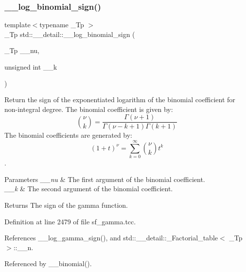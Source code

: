 \subsubsection{\texorpdfstring{\+\_\+\+\_\+log\+\_\+binomial\+\_\+sign()}{\_\_log\_binomial\_sign()}\hspace{0.1cm}{\footnotesize\ttfamily [1/2]}}
{\footnotesize\ttfamily template$<$typename \+\_\+\+Tp $>$ \\
\+\_\+\+Tp std\+::\+\_\+\+\_\+detail\+::\+\_\+\+\_\+log\+\_\+binomial\+\_\+sign (\begin{DoxyParamCaption}\item[{\+\_\+\+Tp}]{\+\_\+\+\_\+nu,  }\item[{unsigned int}]{\+\_\+\+\_\+k }\end{DoxyParamCaption})}



Return the sign of the exponentiated logarithm of the binomial coefficient for non-\/integral degree. The binomial coefficient is given by\+: \[ \binom{\nu}{k} = \frac{\Gamma(\nu+1)}{\Gamma(\nu-k+1) \Gamma(k+1)} \] The binomial coefficients are generated by\+: \[ \left(1 + t\right)^\nu = \sum_{k=0}^\infty \binom{\nu}{k} t^k \]. 


\begin{DoxyParams}{Parameters}
{\em \+\_\+\+\_\+nu} & The first argument of the binomial coefficient. \\
\hline
{\em \+\_\+\+\_\+k} & The second argument of the binomial coefficient. \\
\hline
\end{DoxyParams}
\begin{DoxyReturn}{Returns}
The sign of the gamma function. 
\end{DoxyReturn}


Definition at line 2479 of file sf\+\_\+gamma.\+tcc.



References \+\_\+\+\_\+log\+\_\+gamma\+\_\+sign(), and std\+::\+\_\+\+\_\+detail\+::\+\_\+\+Factorial\+\_\+table$<$ \+\_\+\+Tp $>$\+::\+\_\+\+\_\+n.



Referenced by \+\_\+\+\_\+binomial().

\mbox{\label{namespacestd_1_1____detail_ad73e7e0dfab6a4f54af026fa3d9e9c9a}} 
